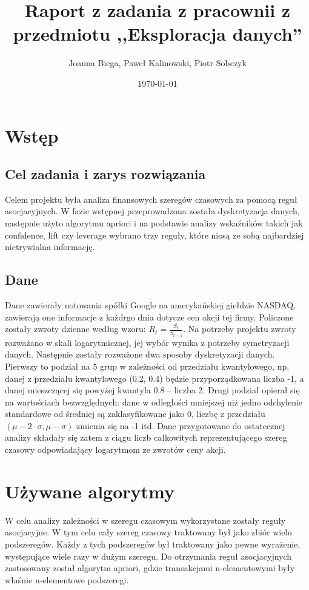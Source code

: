 \documentclass[a4paper,10pt]{article}
\title{Raport z zadania z pracownii z przedmiotu ,,Eksploracja danych''}
\date{\today}
\author{Joanna Biega, Paweł Kalinowski, Piotr Sobczyk}
\begin{document}
\maketitle
\section{Wstęp}

\subsection{Cel zadania i zarys rozwiązania}
Celem projektu była analiza finansowych szeregów czasowych za pomocą reguł asocjacyjnych. W fazie wstępnej przeprowadzona została dyskretyzacja danych, następnie
użyto algorytmu apriori i na podstawie analizy wskaźników takich jak confidence, lift czy leverage wybrano trzy reguły, które niosą ze sobą najbardziej
nietrywialna informację.

\subsection{Dane}
Dane zawierały notowania spółki Google na amerykańskiej giełdzie 
NASDAQ, zawierają one informacje z każdrgo dnia dotycze cen akcji tej firmy. Policzone zostały zwroty dzienne według wzoru: $R_t = \frac{S_t}{S_{t-1}}$.
Na potrzeby projektu zwroty rozważano w skali logarytmicznej, jej wybór wynika z potrzeby symetryzacji danych. 
Następnie zostały rozważone dwa sposoby dyskretyzacji danych. Pierwszy to podział na 5 grup w zależności od przedziału kwantylowego, 
np. danej z przedziału kwantylowego (0.2, 0.4) będzie przyporządkowana liczba -1, a danej mieszczącej się powyżej kwantyla 0.8 – liczba 2.
Drugi podział opierał się na wartościach bezwzględnych: dane w odległości mniejszej niż jedno odchylenie standardowe od średniej są zaklasyfikowane 
jako 0, liczbę z przedziału $(\mu - 2 \cdot \sigma, \mu - \sigma)$ zmienia się na -1 itd.
Dane przygotowane do ostatecznej analizy składały się zatem z ciągu liczb całkowitych reprezentującego szereg czasowy odpowiadający logarytmom ze zwrotów ceny akcji.

\section{Używane algorytmy}
W celu analizy zależności w szeregu czasowym wykorzystane zostały reguły asocjacyjne. W tym celu cały szereg czasowy traktowany był
 jako zbiór wielu podszeregów. Każdy z tych podszeregów był traktowany jako pewne wyrażenie, występujące wiele razy w dużym szeregu. 
Do otrzymania reguł asocjacyjnych zastosowany został algorytm apriori, gdzie transakcjami n-elementowymi były właśnie n-elementowe podszeregi.
\end{document}
